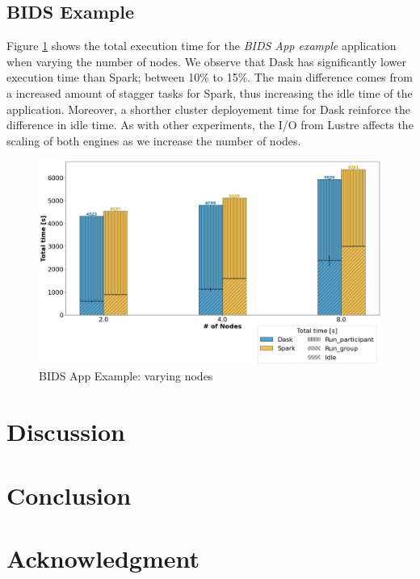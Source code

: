 \documentclass[conference]{IEEEtran}
\begin{document}
\subsection{BIDS Example}
Figure \ref{fig:bids} shows the total execution time for the \textit{BIDS App example} application when varying the number of nodes.
We observe that Dask has significantly lower execution time than Spark; between 10\% to 15\%.
The main difference comes from a increased amount of stagger tasks for Spark, thus increasing the idle time of the application.
Moreover, a shorther cluster deployement time for Dask reinforce the difference in idle time.
As with other experiments, the I/O from Lustre affects the scaling of both engines as we increase the number of nodes.
\begin{figure}[!h]
	\centering
	\includegraphics[clip,width=\columnwidth]{figures/stacked_bids.jpg}
	\caption{BIDS App Example: varying nodes}
	\label{fig:bids}
\end{figure}

\section{Discussion}

\section{Conclusion}

\section*{Acknowledgment}




\end{document}
